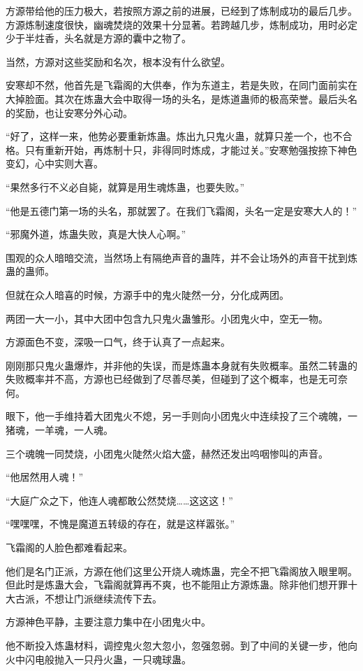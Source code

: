 \begin{this_body}
方源带给他的压力极大，若按照方源之前的进展，已经到了炼制成功的最后几步。方源炼制速度很快，幽魂焚烧的效果十分显著。若跨越几步，炼制成功，用时必定少于半炷香，头名就是方源的囊中之物了。

当然，方源对这些奖励和名次，根本没有什么欲望。

安寒却不然，他首先是飞霜阁的大供奉，作为东道主，若是失败，在同门面前实在大掉脸面。其次在炼蛊大会中取得一场的头名，是炼道蛊师的极高荣誉。最后头名的奖励，也让安寒分外心动。

“好了，这样一来，他势必要重新炼蛊。炼出九只鬼火蛊，就算只差一个，也不合格。只有重新开始，再炼制十只，非得同时炼成，才能过关。”安寒勉强按捺下神色变幻，心中实则大喜。

“果然多行不义必自毙，就算是用生魂炼蛊，也要失败。”

“他是五德门第一场的头名，那就罢了。在我们飞霜阁，头名一定是安寒大人的！”

“邪魔外道，炼蛊失败，真是大快人心啊。”

围观的众人暗暗交流，当然场上有隔绝声音的蛊阵，并不会让场外的声音干扰到炼蛊的蛊师。

但就在众人暗喜的时候，方源手中的鬼火陡然一分，分化成两团。

两团一大一小，其中大团中包含九只鬼火蛊雏形。小团鬼火中，空无一物。

方源面色不变，深吸一口气，终于认真了一点起来。

刚刚那只鬼火蛊爆炸，并非他的失误，而是炼蛊本身就有失败概率。虽然二转蛊的失败概率并不高，方源也已经做到了尽善尽美，但碰到了这个概率，也是无可奈何。

眼下，他一手维持着大团鬼火不熄，另一手则向小团鬼火中连续投了三个魂魄，一猪魂，一羊魂，一人魂。

三个魂魄一同焚烧，小团鬼火陡然火焰大盛，赫然还发出呜咽惨叫的声音。

“他居然用人魂！”

“大庭广众之下，他连人魂都敢公然焚烧……这这这！”

“嘿嘿嘿，不愧是魔道五转级的存在，就是这样嚣张。”

飞霜阁的人脸色都难看起来。

他们是名门正派，方源在他们这里公开烧人魂炼蛊，完全不把飞霜阁放入眼里啊。但此时是炼蛊大会，飞霜阁就算再不爽，也不能阻止方源炼蛊。除非他们想开罪十大古派，不想让门派继续流传下去。

方源神色平静，主要注意力集中在小团鬼火中。

他不断投入炼蛊材料，调控鬼火忽大忽小，忽强忽弱。到了中间的关键一步，他向火中闪电般抛入一只丹火蛊，一只魂球蛊。


\end{this_body}
